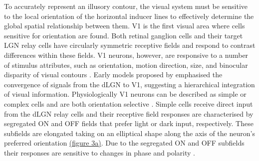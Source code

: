 \documentclass[12pt]{article}
\begin{document}
To accurately represent an illusory contour, the visual system must be sensitive to the local orientation of the horizontal inducer lines to effectively determine the global spatial relationship between them. V1 is the first visual area where cells sensitive for orientation are found. Both retinal ganglion cells and their target LGN relay cells have circularly symmetric receptive fields and respond to contrast differences within these fields. V1 neurons, however, are responsive to a number of stimulus attributes, such as orientation, motion direction, size, and binocular disparity of visual contours \autocite{hubelReceptiveFieldsBinocular1962}. 
Early models proposed by \textcite{hubelReceptiveFieldsBinocular1962} emphasised the convergence of signals from the dLGN to V1, suggesting a hierarchical integration of visual information. Physiologically V1 neurons can be described as simple or complex cells and are both orientation selective \autocite{skottunClassifyingSimpleComplex1991}. Simple cells receive direct input from the dLGN relay cells and their receptive field responses are characterised by segregated ON and OFF fields that prefer light or dark input, respectively. These subfields are elongated taking on an elliptical shape along the axis of the neuron's preferred orientation \hyperref[fig:LIF_Overview]{(figure 3a)}. Due to the segregated ON and OFF subfields their responses are sensitive to changes in phase and polarity \autocite{mechlerClassificationSimpleComplex2002}. 
\bigbreak
\end{document}
